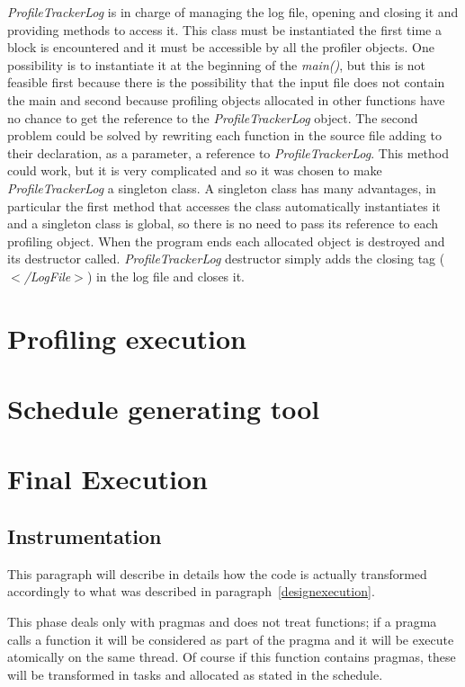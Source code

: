 \documentclass[a4paper,11pt,oneside]{book}
\begin{document}
\emph{ProfileTrackerLog} is in charge of managing the log file, opening and closing it and providing methods to access it. This class must be instantiated the first time a block is encountered and it must be accessible by all the profiler objects. One possibility is to instantiate it at the beginning of the \emph{main()}, but this is not feasible first because there is the possibility that the input file does not contain the main and second because profiling objects allocated in other functions have no chance to get the reference to the \emph{ProfileTrackerLog} object. The second problem could be solved by rewriting each function in the source file adding to their declaration, as a parameter, a reference to \emph{ProfileTrackerLog}. This method could work, but it is very complicated and so it was chosen to make \emph{ProfileTrackerLog} a singleton class. A singleton class has many advantages, in particular the first method that accesses the class automatically instantiates it and a singleton class is global, so there is no need to pass its reference to each profiling object. When the program ends each allocated object is destroyed and its destructor called. \emph{ProfileTrackerLog} destructor simply adds the closing tag (\emph{$<$/LogFile$>$}) in the log file and closes it.


\section{Profiling execution}
\section{Schedule generating tool}
\section{Final Execution}
\subsection{Instrumentation}
This paragraph will describe in details how the code is actually transformed accordingly to what was described in paragraph~\ref{designexecution}.

This phase deals only with pragmas and does not treat functions; if a pragma calls a function it will be considered as part of the pragma and it will be execute atomically on the same thread. Of course if this function contains pragmas, these will be transformed in tasks and allocated as stated in the schedule.
\end{document}
